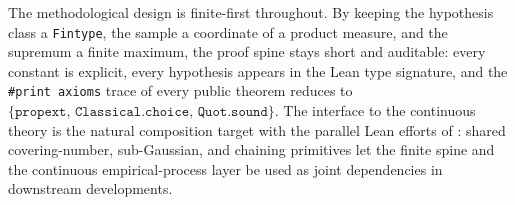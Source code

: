 \documentclass[sigplan,anonymous,review,screen]{acmart}
\begin{document}
The methodological design is finite-first throughout. By keeping the
hypothesis class a \texttt{Fintype}, the sample a coordinate of a
product measure, and the supremum a finite maximum, the proof spine
stays short and auditable: every constant is explicit, every
hypothesis appears in the Lean type signature, and the
\texttt{\#print axioms} trace of every public theorem reduces to
$\{\texttt{propext},\,\texttt{Classical.choice},\,\texttt{Quot.sound}\}$.
The interface to the continuous theory is the natural composition
target with the parallel Lean efforts of : shared
covering-number, sub-Gaussian, and chaining primitives let the finite
spine and the continuous empirical-process layer be used as joint
dependencies in downstream developments.



\end{document}
